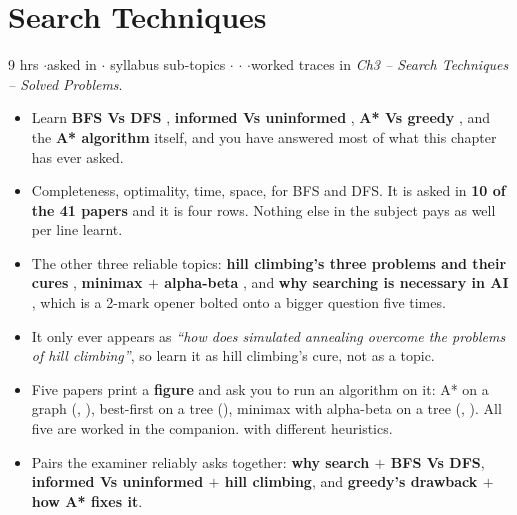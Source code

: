 \section{Search Techniques}

{\color{sub}\footnotesize 9 hrs \gap$\cdot$\gap asked in 
\gap$\cdot$ syllabus sub-topics \gap$\cdot$\gap {} \gap$\cdot$\gap {} \gap$\cdot$\gap worked traces in \emph{Ch3 -- Search Techniques -- Solved
Problems}.}

\begin{itemize}
  \item {} Learn
        \textbf{BFS Vs DFS} , \textbf{informed Vs uninformed} ,
        \textbf{A* Vs greedy} , and the \textbf{A* algorithm} itself, and you have
        answered most of what this chapter has ever asked.
  \item {} Completeness, optimality,
        time, space, for BFS and DFS. It is asked in \textbf{10 of the 41 papers} and it
        is four rows. Nothing else in the subject pays as well per line learnt.
  \item The other three reliable topics: \textbf{hill climbing's three problems and their
        cures} , \textbf{minimax $+$ alpha-beta} , and
        \textbf{why searching is necessary in AI} , which is a 2-mark opener
        bolted onto a bigger question five times.
  \item {} It only ever appears as \emph{``how does simulated annealing overcome the
        problems of hill climbing''}, so learn it as hill climbing's cure, not as a topic.
  \item Five papers print a \textbf{figure} and ask you to run an algorithm on it: A* on a
        graph (, ), best-first on a tree
        (), minimax with alpha-beta on a tree
        (, ). All five are worked in the companion.
         with different
        heuristics.
  \item Pairs the examiner reliably asks together: \textbf{why search $+$ BFS Vs DFS},
        \textbf{informed Vs uninformed $+$ hill climbing}, and
        \textbf{greedy's drawback $+$ how A* fixes it}.
\end{itemize}

